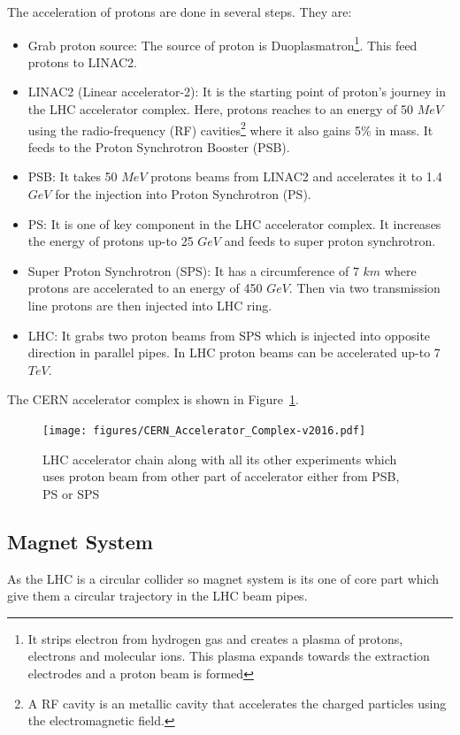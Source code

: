 The acceleration of protons are done in several steps. They are:
\begin{itemize}
    \item Grab proton source: The source of proton is Duoplasmatron\footnote{It strips electron from hydrogen gas and creates a plasma of protons, electrons and molecular ions. This plasma expands towards the extraction electrodes and a proton beam is formed}\cite{LHC-tdr-vol3}. This feed protons to LINAC2.
    \item LINAC2 (Linear accelerator-2): It is the starting point of proton's journey in the LHC accelerator complex. Here, protons reaches to an energy of 50 $MeV$ using the radio-frequency (RF) cavities\footnote{A RF cavity is an metallic cavity that accelerates the charged particles using the electromagnetic field.} where it also gains 5\% in mass. It feeds to the Proton Synchrotron Booster (PSB).
    \item PSB: It takes 50 $MeV$ protons beams from LINAC2 and accelerates it to 1.4 $GeV$ for the injection into Proton Synchrotron (PS).
    \item PS: It is one of key component in the LHC accelerator complex. It increases the energy of protons up-to 25 $GeV$ and feeds to super proton synchrotron.
    \item Super Proton Synchrotron (SPS): It has a circumference of 7 $km$ where protons are accelerated to an energy of 450 $GeV$. Then via two transmission line protons are then injected into LHC ring.
    \item LHC: It grabs two proton beams from SPS which is injected into opposite direction in parallel pipes. In LHC proton beams can be accelerated up-to 7 $TeV$.
\end{itemize}
The CERN accelerator complex is shown in Figure~\ref{fig:CERN-accelerator-complex}.  
\begin{figure}[!htbp]
	\centering
	\texttt{[image: figures/CERN\_Accelerator\_Complex-v2016.pdf]}
	\caption{LHC accelerator chain along with all its other experiments which uses proton beam from other part of accelerator either from PSB, PS or SPS\cite{Fig-CERN-accelerator-complex}}
	\label{fig:CERN-accelerator-complex}
\end{figure}

\subsection{Magnet System}
As the LHC is a circular collider so magnet system is its one of core part which give them a circular trajectory in the LHC beam pipes. %

